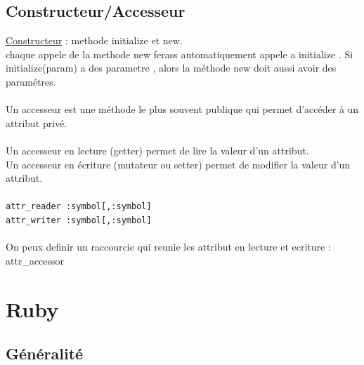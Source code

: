 \documentclass[a4paper,12pt,openany]{book}
\begin{document}

\section{Constructeur/Accesseur}

\underline{Constructeur} : methode initialize et new.\\
chaque appele de la methode new ferass automatiquement appele a initialize . Si initialize(param) a des parametre , alors la méthode new doit aussi avoir des paramétres.\\
\\
Un accesseur est une méthode le plus souvent publique qui permet d'accéder à un attribut privé.\\
\\
Un accesseur en lecture (getter) permet de lire la valeur d'un attribut.\\
Un accesseur en écriture (mutateur ou setter) permet de modifier la valeur d'un attribut.\\
\\
\verb+attr_reader :symbol[,:symbol]+ \\
\verb+attr_writer :symbol[,:symbol]+  \\
\\
On peux definir un raccourcie qui reunie les attribut en lecture et ecriture : attr\_accessor \\




\chapter{Ruby}

\section{Généralité}
\end{document}
